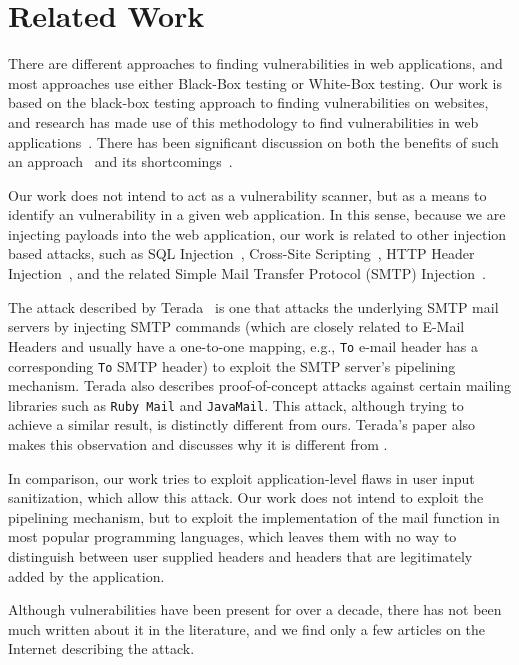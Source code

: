 \section{Related Work}
\vspace{-2.5ex}
There are different approaches to finding vulnerabilities in web applications, and most approaches use either Black-Box testing or White-Box testing.
Our work is based on the black-box testing approach to finding vulnerabilities on websites, and research has made use of this methodology to find vulnerabilities in web applications~\cite{Beizer:1995:BTT:202699,Huang,kals2006secubat,payet13:ears-in-the-wild,zanero2005automatic}. There has been significant discussion on both the benefits of such an approach~\cite{black-box} and its shortcomings~\cite{Doupe2012,Doupe2010}.

Our work does not intend to act as a vulnerability scanner, but as a means to identify an \ehi vulnerability in a given web application. In this sense, because we are injecting payloads into the web application, our work is related to other injection based attacks, such as SQL Injection~\cite{sql1,sql0,sql2}, Cross-Site Scripting~\cite{Injection1,KleinAmit}, HTTP Header Injection~\cite{sessionride}, and the related Simple Mail Transfer Protocol (SMTP) Injection~\cite{Terada2015}.

The attack described by Terada~\cite{Terada2015} is one that attacks the underlying SMTP mail servers by injecting SMTP commands (which are closely related to E-Mail Headers and usually have a one-to-one mapping, e.g., \texttt{To} e-mail header has a corresponding \texttt{To} SMTP header) to exploit the SMTP server's pipelining mechanism. Terada also describes proof-of-concept attacks against certain mailing libraries such as \texttt{Ruby Mail} and \texttt{JavaMail}. This attack, although trying to achieve a similar result, is distinctly different from ours. Terada's paper also makes this observation and discusses why it is different from \ehi.

In comparison, our work tries to exploit application-level flaws in user input sanitization, which allow this attack. Our work does not intend to exploit the pipelining mechanism, but to exploit the implementation of the mail function in most popular programming languages, which leaves them with no way to distinguish between user supplied headers and headers that are legitimately added by the application.

Although \ehi vulnerabilities have been present for over a decade, there has not been much written about it in the literature, and we find only a few articles on the Internet describing the attack.

